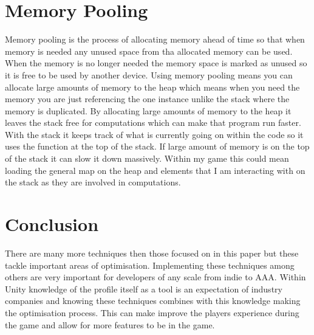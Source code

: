 \documentclass[journal]{IEEEtran}
\begin{document}
\section{Memory Pooling}
Memory pooling is the process of allocating memory ahead of time so that when memory is needed any unused space from tha allocated memory can be used.
When the memory is no longer needed the memory space is marked as unused so it is free to be used by another device.
Using memory pooling means you can allocate large amounts of memory to the heap which means when you need the memory you are just referencing the one instance unlike the stack where the memory is duplicated.%
By allocating large amounts of memory to the heap it leaves the stack free for computations which can make that program run faster.%
With the stack it keeps track of what is currently going on within the code so it uses the function at the top of the stack.
If large amount of memory is on the top of the stack it can slow it down massively.%
Within my game this could mean loading the general map on the heap and elements that I am interacting with on the stack as they are involved in computations.

\section{Conclusion}
There are many more techniques then those focused on in this paper but these tackle important areas of optimisation.
Implementing these techniques among others are very important for developers of any scale from indie to AAA.
Within Unity knowledge of the profile itself as a tool is an expectation of industry companies and knowing these techniques combines with this knowledge making the optimisation process.
This can make improve the players experience during the game and allow for more features to be in the game.


%
%


\end{document}
